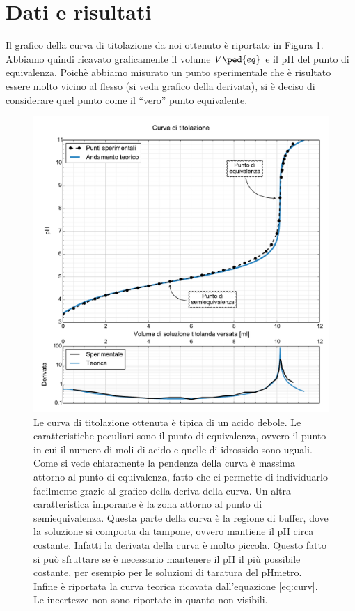 \section*{Dati e risultati}

Il grafico della curva di titolazione da noi ottenuto è riportato in Figura \ref{fig:curva}. Abbiamo quindi ricavato
graficamente il volume $V\ped{eq}$ e il pH del punto di equivalenza. Poichè abbiamo misurato un punto sperimentale che è risultato
essere molto vicino al flesso (si veda grafico della derivata), si è deciso di considerare quel punto come il ``vero''
punto equivalente.

\begin{figure}
    \includegraphics[scale=0.55]{curva.pdf}
    \caption{Le curva di titolazione ottenuta è tipica di un acido debole. Le caratteristiche peculiari sono il punto di equivalenza,
        ovvero il punto in cui il numero di moli di acido e quelle di idrossido sono uguali. Come si vede chiaramente la
        pendenza della curva è massima attorno al punto di equivalenza, fatto che ci permette di individuarlo facilmente grazie al grafico
        della deriva della curva.
        Un altra caratteristica imporante è la zona attorno al punto di semiequivalenza. Questa parte della curva è la
        regione di buffer, dove la soluzione si comporta da tampone, ovvero mantiene il pH circa costante. Infatti la derivata della
        curva è molto piccola. Questo fatto si può sfruttare se è necessario mantenere il pH il più possibile costante, per esempio per le soluzioni
        di taratura del pHmetro. Infine è riportata la curva teorica ricavata dall'equazione \eqref{eq:curv}. Le incertezze non sono riportate
        in quanto non visibili.}
    \label{fig:curva}
\end{figure}

